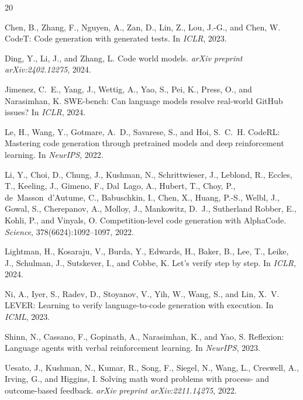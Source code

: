 \documentclass[11pt]{article}
\begin{document}
\begin{thebibliography}{20}

Chen, B., Zhang, F., Nguyen, A., Zan, D., Lin, Z., Lou, J.-G., and Chen, W.
\newblock CodeT: Code generation with generated tests.
\newblock In \emph{ICLR}, 2023.

Ding, Y., Li, J., and Zhang, L.
\newblock Code world models.
\newblock \emph{arXiv preprint arXiv:2402.12275}, 2024.

Jimenez, C.~E., Yang, J., Wettig, A., Yao, S., Pei, K., Press, O., and Narasimhan, K.
\newblock SWE-bench: Can language models resolve real-world GitHub issues?
\newblock In \emph{ICLR}, 2024.

Le, H., Wang, Y., Gotmare, A.~D., Savarese, S., and Hoi, S.~C.~H.
\newblock CodeRL: Mastering code generation through pretrained models and deep reinforcement learning.
\newblock In \emph{NeurIPS}, 2022.

Li, Y., Choi, D., Chung, J., Kushman, N., Schrittwieser, J., Leblond, R., Eccles, T., Keeling, J., Gimeno, F., Dal~Lago, A., Hubert, T., Choy, P., de~Masson~d'Autume, C., Babuschkin, I., Chen, X., Huang, P.-S., Welbl, J., Gowal, S., Cherepanov, A., Molloy, J., Mankowitz, D.~J., Sutherland Robber, E., Kohli, P., and Vinyals, O.
\newblock Competition-level code generation with AlphaCode.
\newblock \emph{Science}, 378(6624):1092--1097, 2022.

Lightman, H., Kosaraju, V., Burda, Y., Edwards, H., Baker, B., Lee, T., Leike, J., Schulman, J., Sutskever, I., and Cobbe, K.
\newblock Let's verify step by step.
\newblock In \emph{ICLR}, 2024.

Ni, A., Iyer, S., Radev, D., Stoyanov, V., Yih, W., Wang, S., and Lin, X.~V.
\newblock LEVER: Learning to verify language-to-code generation with execution.
\newblock In \emph{ICML}, 2023.

Shinn, N., Cassano, F., Gopinath, A., Narasimhan, K., and Yao, S.
\newblock Reflexion: Language agents with verbal reinforcement learning.
\newblock In \emph{NeurIPS}, 2023.

Uesato, J., Kushman, N., Kumar, R., Song, F., Siegel, N., Wang, L., Creswell, A., Irving, G., and Higgins, I.
\newblock Solving math word problems with process- and outcome-based feedback.
\newblock \emph{arXiv preprint arXiv:2211.14275}, 2022.


\end{thebibliography}
\end{document}
